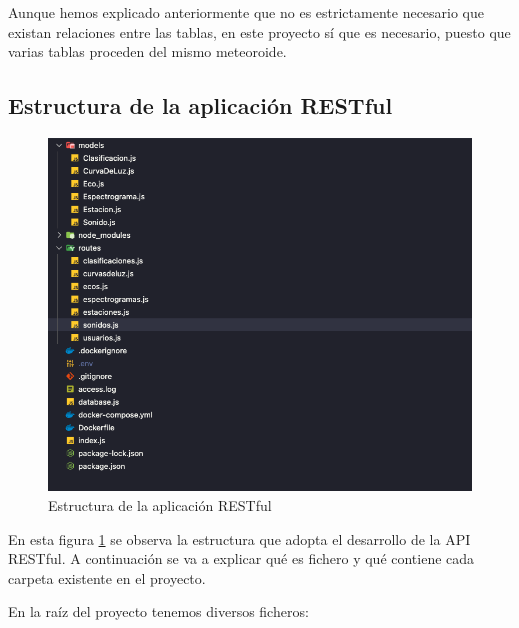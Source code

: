 Aunque hemos explicado anteriormente que no es estrictamente necesario que existan relaciones entre las tablas, en este proyecto sí que es necesario, puesto que varias tablas proceden del mismo meteoroide.


\subsection{Estructura de la aplicación RESTful}

\begin{figure}[H]
    \centering
    \includegraphics[width=\textwidth]{include/figuras/EstructuraAPI.png}
    \caption{Estructura de la aplicación RESTful}
    \label{fig:estructura_api}
\end{figure}

En esta figura \ref{fig:estructura_api} se observa la estructura que adopta el desarrollo de la API RESTful. A continuación se va a explicar qué es fichero y qué contiene cada carpeta existente en el proyecto.

En la raíz del proyecto tenemos diversos ficheros:


